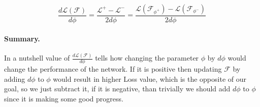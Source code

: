 \begin{equation} \label{eq:numgrad}
    \frac{d\mathcal{L}(\mathcal{F})}{d\phi} = 
    \frac{\mathcal{L}^+ - \mathcal{L}^-}{2 d\phi} = 
    \frac{\mathcal{L}(\mathcal{F}_{\phi^+}) - \mathcal{L}(\mathcal{F}_{\phi^-})}{2 d\phi}
\end{equation}

\paragraph{Summary.} In a nutshell value of $\frac{d\mathcal{L}(\mathcal{F})}{d\phi}$ tells how changing the parameter $\phi$ by $d\phi$ would change the performance of the network. If it is positive then updating $\mathcal{F}$ by adding $d\phi$ to $\phi$ would result in higher Loss value, which is the opposite of our goal, so we just subtract it, if it is negative, than trivially we should add $d\phi$ to $\phi$ since it is making some good progress.

